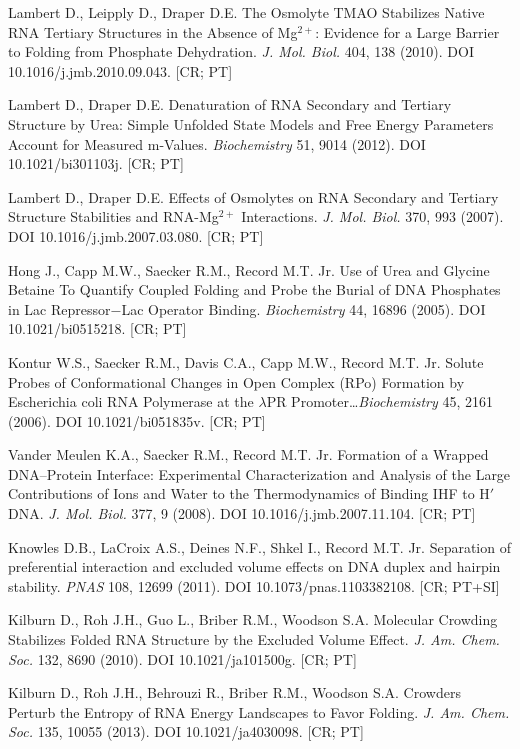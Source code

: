 \documentclass[11pt,a4paper]{article}
\begin{document}
\begin{enumerate}[label={[\arabic*]},ref={\arabic*},leftmargin=*,itemsep=0pt]
\item\label{b:llld10} Lambert D., Leipply D., Draper D.E. The Osmolyte TMAO Stabilizes Native RNA Tertiary Structures in the Absence of Mg$^{2+}$: Evidence for a Large Barrier to Folding from Phosphate Dehydration. \emph{J. Mol. Biol.} 404, 138 (2010). DOI 10.1016/j.jmb.2010.09.043. [CR; PT]
\item\label{b:ld12} Lambert D., Draper D.E. Denaturation of RNA Secondary and Tertiary Structure by Urea: Simple Unfolded State Models and Free Energy Parameters Account for Measured m-Values. \emph{Biochemistry} 51, 9014 (2012). DOI 10.1021/bi301103j. [CR; PT]
\item\label{b:ld07} Lambert D., Draper D.E. Effects of Osmolytes on RNA Secondary and Tertiary Structure Stabilities and RNA-Mg$^{2+}$ Interactions. \emph{J. Mol. Biol.} 370, 993 (2007). DOI 10.1016/j.jmb.2007.03.080. [CR; PT]
\item\label{b:hong05} Hong J., Capp M.W., Saecker R.M., Record M.T. Jr. Use of Urea and Glycine Betaine To Quantify Coupled Folding and Probe the Burial of DNA Phosphates in Lac Repressor$-$Lac Operator Binding. \emph{Biochemistry} 44, 16896 (2005). DOI 10.1021/bi0515218. [CR; PT]
\item\label{b:kontur} Kontur W.S., Saecker R.M., Davis C.A., Capp M.W., Record M.T. Jr. Solute Probes of Conformational Changes in Open Complex (RPo) Formation by Escherichia coli RNA Polymerase at the $\lambda$PR Promoter\ldots \emph{Biochemistry} 45, 2161 (2006). DOI 10.1021/bi051835v. [CR; PT]
\item\label{b:vdm} Vander Meulen K.A., Saecker R.M., Record M.T. Jr. Formation of a Wrapped DNA--Protein Interface: Experimental Characterization and Analysis of the Large Contributions of Ions and Water to the Thermodynamics of Binding IHF to H$'$ DNA. \emph{J. Mol. Biol.} 377, 9 (2008). DOI 10.1016/j.jmb.2007.11.104. [CR; PT]
\item\label{b:kn11} Knowles D.B., LaCroix A.S., Deines N.F., Shkel I., Record M.T. Jr. Separation of preferential interaction and excluded volume effects on DNA duplex and hairpin stability. \emph{PNAS} 108, 12699 (2011). DOI 10.1073/pnas.1103382108. [CR; PT+SI]
\item\label{b:kil10} Kilburn D., Roh J.H., Guo L., Briber R.M., Woodson S.A. Molecular Crowding Stabilizes Folded RNA Structure by the Excluded Volume Effect. \emph{J. Am. Chem. Soc.} 132, 8690 (2010). DOI 10.1021/ja101500g. [CR; PT]
\item\label{b:kil13} Kilburn D., Roh J.H., Behrouzi R., Briber R.M., Woodson S.A. Crowders Perturb the Entropy of RNA Energy Landscapes to Favor Folding. \emph{J. Am. Chem. Soc.} 135, 10055 (2013). DOI 10.1021/ja4030098. [CR; PT]

\end{enumerate}
\end{document}
